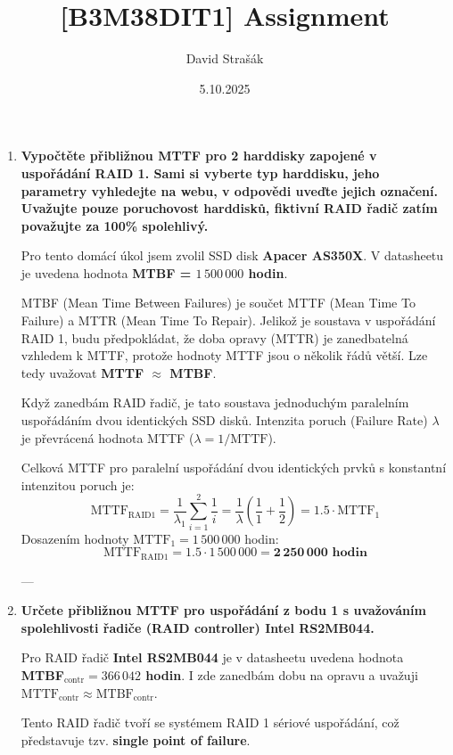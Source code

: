 \documentclass[10pt]{article} %
\title{[B3M38DIT1] Assignment}
\author{David Strašák}
\date{5.10.2025}
\begin{document}
	\maketitle
	
	\begin{enumerate}
		\item \textbf{Vypočtěte přibližnou MTTF pro 2 harddisky zapojené v uspořádání RAID 1. Sami si vyberte typ harddisku, jeho parametry vyhledejte na webu, v odpovědi uveďte jejich označení. Uvažujte pouze poruchovost harddisků, fiktivní RAID řadič zatím považujte za 100\% spolehlivý.}
		
		Pro tento domácí úkol jsem zvolil SSD disk \textbf{Apacer AS350X}. V datasheetu \cite{ssddisk} je uvedena hodnota \textbf{MTBF = $1\,500\,000$ hodin}.
		
		MTBF (Mean Time Between Failures) je součet MTTF (Mean Time To Failure) a MTTR (Mean Time To Repair). Jelikož je soustava v uspořádání RAID 1, budu předpokládat, že doba opravy (MTTR) je zanedbatelná vzhledem k MTTF, protože hodnoty MTTF jsou o několik řádů větší. Lze tedy uvažovat \textbf{MTTF $\approx$ MTBF}.
		
		Když zanedbám RAID řadič, je tato soustava jednoduchým paralelním uspořádáním dvou identických SSD disků. Intenzita poruch (Failure Rate) $\lambda$ je převrácená hodnota MTTF ($\lambda = 1/\text{MTTF}$).
		
		Celková MTTF pro paralelní uspořádání dvou identických prvků s konstantní intenzitou poruch je:
		$$
		\text{MTTF}_{\text{RAID}1} = \frac{1}{\lambda_1} \sum_{i=1}^{2} \frac{1}{i} = \frac{1}{\lambda} \left(\frac{1}{1} + \frac{1}{2}\right) = 1.5 \cdot \text{MTTF}_{1}
		$$
		Dosazením hodnoty $\text{MTTF}_1 = 1\,500\,000$ hodin:
		$$
		\text{MTTF}_{\text{RAID}1} = 1.5 \cdot 1\,500\,000 = \mathbf{2\,250\,000 \text{ hodin}}
		$$
		
		---
		
		\item \textbf{Určete přibližnou MTTF pro uspořádání z bodu 1 s uvažováním spolehlivosti řadiče (RAID controller) Intel RS2MB044.}
		
		Pro RAID řadič \textbf{Intel RS2MB044} je v datasheetu \cite{oldControllerDS} uvedena hodnota \textbf{MTBF$_{\text{contr}} = 366\,042$ hodin}. I zde zanedbám dobu na opravu a uvažuji $\text{MTTF}_{\text{contr}} \approx \text{MTBF}_{\text{contr}}$.
		
		Tento RAID řadič tvoří se systémem RAID 1 sériové uspořádání, což představuje tzv. \textbf{single point of failure}.
		

\end{enumerate}
\end{document}
